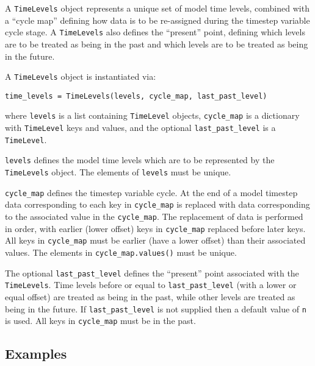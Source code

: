 \documentclass[a4paper]{book}
\begin{document}
A \verb+TimeLevels+ object represents a unique set of model time levels,
combined with a ``cycle map'' defining how data is to be re-assigned during the
timestep variable cycle stage. A \verb+TimeLevels+ also defines the ``present''
point, defining which levels are to be treated as being in the past and which
levels are to be treated as being in the future.

A \verb+TimeLevels+ object is instantiated via:
\begin{lstlisting}
time_levels = TimeLevels(levels, cycle_map, last_past_level)
\end{lstlisting}
where \verb+levels+ is a list containing \verb+TimeLevel+ objects,
\verb+cycle_map+ is a dictionary with \verb+TimeLevel+ keys and values, and the
optional \verb+last_past_level+ is a \verb+TimeLevel+.

\verb+levels+ defines the model time levels which are to be represented by the
\verb+TimeLevels+ object. The elements of \verb+levels+ must be unique.

\verb+cycle_map+ defines the timestep variable cycle. At the end of a model
timestep data corresponding to each key in \verb+cycle_map+ is replaced with
data corresponding to the associated value in the \verb+cycle_map+. The
replacement of data is performed in order, with earlier (lower offset) keys in
\verb+cycle_map+ replaced before later keys. All keys in \verb+cycle_map+ must
be earlier (have a lower offset) than their associated values. The elements in
\verb+cycle_map.values()+ must be unique.

The optional \verb+last_past_level+ defines the ``present'' point associated
with the \verb+TimeLevels+. Time levels before or equal to
\verb+last_past_level+ (with a lower or equal offset) are treated as being in
the past, while other levels are treated as being in the future. If
\verb+last_past_level+ is not supplied then a default value of \verb+n+ is used.
All keys in \verb+cycle_map+ must be in the past.

\subsection*{Examples}
\end{document}
